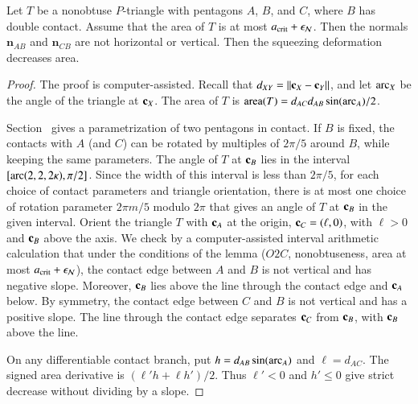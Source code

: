 \begin{lemma}
  Let $T$ be a nonobtuse $P$-triangle with pentagons $A$, $B$, and
  $C$, where $B$ has double contact.  Assume that the area of $T$ is  at most $a_\text{crit}+\epsilon_{\mathcal N}$.
  Then the normals $\mathbf n_{AB}$ and $\mathbf n_{CB}$ are not horizontal or vertical.
  Then the squeezing
  deformation decreases area.
\end{lemma}

\begin{proof}
  The proof is computer-assisted.
   Recall that $\dx{XY} = \dd{X}{Y}$, and let
  $\operatorname{arc}_X$ be the angle of the triangle at ${\mathbf c}_X$.  The area of $T$ is
   ${\operatorname{area}}(T) = d_{AC} d_{AB} \sin(\operatorname{arc}_A)/2$.

   Section~ gives a parametrization of two pentagons in contact.
   If $B$ is fixed, the contacts with $A$ (and $C$) can be rotated by multiples
   of $2\pi/5$ around $B$, while keeping the same parameters.
   The angle of $T$ at ${\mathbf c}_B$ lies in the interval
   \([\operatorname{arc}(2,2,2\kappa),\pi/2]\).  Since the width of this interval is less
   than $2\pi/5$, for each choice of contact parameters and triangle orientation, there is at most one choice
   of rotation parameter $2\pi m/5$ modulo $2\pi$ that gives an angle of $T$ at ${\mathbf c}_B$
   in the given interval.
   Orient the triangle $T$ with ${\mathbf c}_A$ at the origin, ${\mathbf c}_C=(\ell,0)$, with $\ell>0$ and
   ${\mathbf c}_B$ above the axis.
   We check by a computer-assisted interval arithmetic calculation that under the conditions of the
   lemma ($O2C$, nonobtuseness, area at most $a_\text{crit}+\epsilon_{\mathcal N}$), the contact edge
   between $A$ and $B$ is not vertical and has negative slope.
   Moreover, ${\mathbf c}_B$ lies above the line through the contact edge and ${\mathbf c}_A$ below.
   By symmetry, the contact edge between $C$ and $B$ is not vertical and has a positive slope.
   The line through the contact edge separates ${\mathbf c}_C$ from ${\mathbf c}_B$, with ${\mathbf c}_B$ above the line.
   
  On any differentiable contact branch, put $h=d_{AB}\sin(\operatorname{arc}_A)$
  and $\ell=d_{AC}$.  The signed area derivative is
  $(\ell'h+\ell h')/2$.  Thus $\ell'<0$ and $h'\le0$
  give strict decrease without dividing by a slope.


\end{proof}
